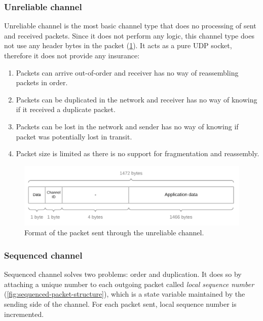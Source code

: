 \documentclass[times, utf8, diplomski]{fer}
\begin{document}
\subsubsection{Unreliable channel}
Unreliable channel is the most basic channel type that does no processing of sent and received packets. Since it does not perform any logic, this channel type does not use any header bytes in the packet (\ref{fig:unreliable-packet-structure}). It acts as a pure UDP socket, therefore it does not provide any insurance:

\begin{enumerate}
	\item Packets can arrive out-of-order and receiver has no way of reassembling packets in order.
	\item Packets can be duplicated in the network and receiver has no way of knowing if it received a duplicate packet.
	\item Packets can be lost in the network and sender has no way of knowing if packet was potentially lost in transit.
	\item Packet size is limited as there is no support for fragmentation and reassembly.
\end{enumerate}

\begin{figure}[h!]
	\centering
	\includegraphics[scale=0.2]{Unreliable-packet-structure}
	\caption{Format of the packet sent through the unreliable channel.}
	\label{fig:unreliable-packet-structure}
\end{figure}



\subsubsection{Sequenced channel}
Sequenced channel solves two problems: order and duplication. It does so by attaching a unique number to each outgoing packet called \textit{local sequence number} (\ref{fig:sequenced-packet-structure}), which is a state variable maintained by the sending side of the channel. For each packet sent, local sequence number is incremented. 
\end{document}
